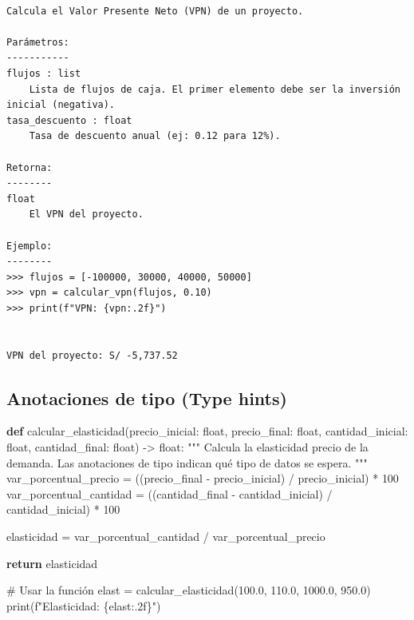 \documentclass[
  doc,
  floatsintext,
  longtable,
  a4paper,
  nolmodern,
  notxfonts,
  notimes,
  12pt,
  colorlinks=true,linkcolor=blue,citecolor=blue,urlcolor=blue]{apa7}
\newenvironment{Shaded}{\begin{snugshade}}{\end{snugshade}}
\newcommand{\BuiltInTok}[1]{\textcolor[rgb]{0.00,0.23,0.31}{#1}}
\newcommand{\CommentTok}[1]{\textcolor[rgb]{0.37,0.37,0.37}{#1}}
\newcommand{\ControlFlowTok}[1]{\textcolor[rgb]{0.00,0.23,0.31}{\textbf{#1}}}
\newcommand{\DecValTok}[1]{\textcolor[rgb]{0.68,0.00,0.00}{#1}}
\newcommand{\FloatTok}[1]{\textcolor[rgb]{0.68,0.00,0.00}{#1}}
\newcommand{\KeywordTok}[1]{\textcolor[rgb]{0.00,0.23,0.31}{\textbf{#1}}}
\newcommand{\NormalTok}[1]{\textcolor[rgb]{0.00,0.23,0.31}{#1}}
\newcommand{\OperatorTok}[1]{\textcolor[rgb]{0.37,0.37,0.37}{#1}}
\newcommand{\SpecialCharTok}[1]{\textcolor[rgb]{0.37,0.37,0.37}{#1}}
\newcommand{\SpecialStringTok}[1]{\textcolor[rgb]{0.13,0.47,0.30}{#1}}
\begin{document}
\begin{verbatim}

Calcula el Valor Presente Neto (VPN) de un proyecto.

Parámetros:
-----------
flujos : list
    Lista de flujos de caja. El primer elemento debe ser la inversión inicial (negativa).
tasa_descuento : float
    Tasa de descuento anual (ej: 0.12 para 12%).

Retorna:
--------
float
    El VPN del proyecto.

Ejemplo:
--------
>>> flujos = [-100000, 30000, 40000, 50000]
>>> vpn = calcular_vpn(flujos, 0.10)
>>> print(f"VPN: {vpn:.2f}")


VPN del proyecto: S/ -5,737.52
\end{verbatim}

\subsection{Anotaciones de tipo (Type
hints)}\label{anotaciones-de-tipo-type-hints}

\begin{Shaded}
\begin{Highlighting}[]
\KeywordTok{def}\NormalTok{ calcular\_elasticidad(precio\_inicial: }\BuiltInTok{float}\NormalTok{, }
\NormalTok{                        precio\_final: }\BuiltInTok{float}\NormalTok{,}
\NormalTok{                        cantidad\_inicial: }\BuiltInTok{float}\NormalTok{,}
\NormalTok{                        cantidad\_final: }\BuiltInTok{float}\NormalTok{) }\OperatorTok{{-}\textgreater{}} \BuiltInTok{float}\NormalTok{:}
    \CommentTok{"""}
\CommentTok{    Calcula la elasticidad precio de la demanda.}
\CommentTok{    }
\CommentTok{    Las anotaciones de tipo indican qué tipo de datos se espera.}
\CommentTok{    """}
\NormalTok{    var\_porcentual\_precio }\OperatorTok{=}\NormalTok{ ((precio\_final }\OperatorTok{{-}}\NormalTok{ precio\_inicial) }\OperatorTok{/}\NormalTok{ precio\_inicial) }\OperatorTok{*} \DecValTok{100}
\NormalTok{    var\_porcentual\_cantidad }\OperatorTok{=}\NormalTok{ ((cantidad\_final }\OperatorTok{{-}}\NormalTok{ cantidad\_inicial) }\OperatorTok{/}\NormalTok{ cantidad\_inicial) }\OperatorTok{*} \DecValTok{100}
    
\NormalTok{    elasticidad }\OperatorTok{=}\NormalTok{ var\_porcentual\_cantidad }\OperatorTok{/}\NormalTok{ var\_porcentual\_precio}
    
    \ControlFlowTok{return}\NormalTok{ elasticidad}

\CommentTok{\# Usar la función}
\NormalTok{elast }\OperatorTok{=}\NormalTok{ calcular\_elasticidad(}\FloatTok{100.0}\NormalTok{, }\FloatTok{110.0}\NormalTok{, }\FloatTok{1000.0}\NormalTok{, }\FloatTok{950.0}\NormalTok{)}
\BuiltInTok{print}\NormalTok{(}\SpecialStringTok{f"Elasticidad: }\SpecialCharTok{\{}\NormalTok{elast}\SpecialCharTok{:.2f\}}\SpecialStringTok{"}\NormalTok{)}
\end{Highlighting}
\end{Shaded}
\end{document}
